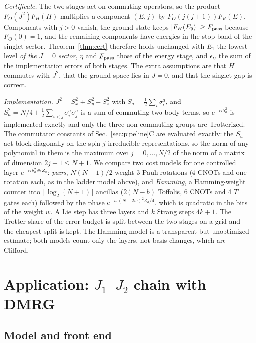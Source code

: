 \documentclass[aps,pra,twocolumn,superscriptaddress,nofootinbib]{revtex4-2}
\begin{document}
\emph{Certificate.} The two stages act on commuting operators, so the product $F_O(J^2)F_H(H)$ multiplies a
component $(E,j)$ by $F_O(j(j+1))F_H(E)$. Components with $j>0$ vanish, the ground state keeps $|F_H(E_0)|\ge F_{\rm pass}$
because $F_O(0)=1$, and the remaining components have energies in the stop band of the singlet sector. Theorem~\ref{thm:cert}
therefore holds unchanged with $E_1$ the lowest level \emph{of the $J=0$ sector}, $\eta$ and $F_{\rm pass}$ those of the energy
stage, and $\epsilon_U$ the sum of the implementation errors of both stages. The extra assumptions are that $H$ commutes
with $J^2$, that the ground space lies in $J=0$, and that the singlet gap is correct.

\emph{Implementation.} $J^2=S_x^2+S_y^2+S_z^2$ with $S_a=\tfrac12\sum_i\sigma^a_i$, and
$S_a^2=N/4+\tfrac12\sum_{i<j}\sigma^a_i\sigma^a_j$ is a sum of commuting two-body terms, so $e^{-i\tau S_a^2}$ is implemented exactly
and only the three non-commuting groups are Trotterized. The commutator constants of Sec.~\ref{sec:pipeline}C are evaluated exactly:
the $S_a$ act block-diagonally on the spin-$j$ irreducible representations, so the norm of any polynomial in them is the maximum over
$j=0,\dots,N/2$ of the norm of a matrix of dimension $2j+1\le N+1$. We compare two cost models for one controlled layer
$e^{-i\tau S_a^2\otimes Z_a}$: \emph{pairs}, $N(N-1)/2$ weight-3 Pauli rotations (4 CNOTs and one rotation each, as in the ladder
model above), and \emph{Hamming}, a Hamming-weight counter into $\lceil\log_2(N+1)\rceil$ ancillas ($2(N-b)$ Toffolis, 6 CNOTs and
4 $T$ gates each) followed by the phase $e^{-i\tau(N-2w)^2Z_a/4}$, which is quadratic in the bits of the weight $w$. A Lie step has three layers
and $k$ Strang steps $4k+1$. The Trotter share of the error budget is split between the two stages on a grid and the cheapest split is kept.
The Hamming model is a transparent but unoptimized estimate; both models count only the layers, not basis changes, which are Clifford.

\section{Application: $J_1$--$J_2$ chain with DMRG}
\label{sec:application}

\subsection{Model and front end}
\end{document}
